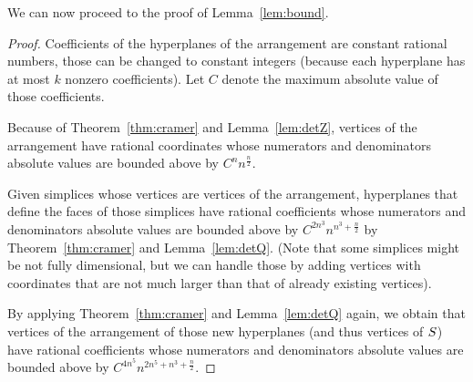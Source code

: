 We can now proceed to the proof of Lemma~\ref{lem:bound}.
\begin{proof}
	Coefficients of the hyperplanes of the arrangement are constant rational
	numbers, those can be changed to constant integers (because each
	hyperplane has at most $k$ nonzero coefficients). Let $C$ denote the
	maximum absolute value of those coefficients.

	Because of Theorem~\ref{thm:cramer} and Lemma~\ref{lem:detZ}, vertices of
	the arrangement have rational coordinates whose numerators and
	denominators absolute values are bounded above by $C^n n^{\frac n2}$.

	Given simplices whose vertices are vertices of the arrangement, hyperplanes
	that define the faces of those simplices have rational coefficients whose
	numerators and denominators absolute values are bounded above by $C^{2n^3}
	n^{n^3+\frac n2}$ by Theorem~\ref{thm:cramer} and Lemma~\ref{lem:detQ}.
	(Note that some simplices might be not fully dimensional, but we can handle
	those by adding vertices with coordinates that are not much larger than
	that of already existing vertices).

	By applying Theorem~\ref{thm:cramer} and Lemma~\ref{lem:detQ} again, we
	obtain that vertices of the arrangement of those new hyperplanes (and thus
	vertices of $S$) have rational coefficients whose numerators and
	denominators absolute values are bounded above by $C^{4n^5} n^{2n^5+n^3+\frac n2}$.
\end{proof}
